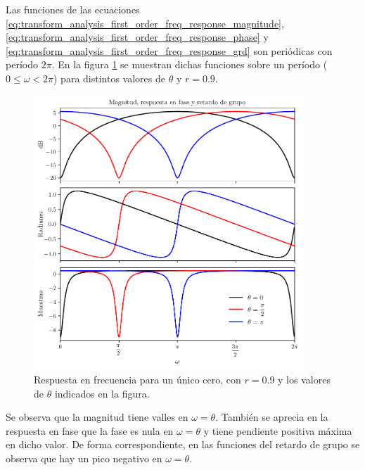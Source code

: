 \documentclass[a4paper]{report}
\begin{document}
Las funciones de las ecuaciones \ref{eq:transform_analysis_first_order_freq_response_magnitude}, \ref{eq:transform_analysis_first_order_freq_response_phase} y \ref{eq:transform_analysis_first_order_freq_response_grd} son periódicas con período \(2\pi\). En la figura \ref{fig:transform_analysis_first_order_freq_response_theta} se muestran dichas funciones sobre un período (\(0\leq\omega<2\pi\)) para distintos valores de \(\theta\) y \(r=0.9\).
\begin{figure}[!htb]
 \begin{center}
 \includegraphics[width=0.9\textwidth]{figuras/transform_analysis_first_order_freq_response_theta.pdf}
 \caption{\label{fig:transform_analysis_first_order_freq_response_theta} Respuesta en frecuencia para un único cero, con \(r=0.9\) y los valores de \(\theta\) indicados en la figura.}
 \end{center}
\end{figure}
Se observa que la magnitud tiene valles en \(\omega=\theta\). También se aprecia en la respuesta en fase que la fase es nula en \(\omega=\theta\) y tiene pendiente positiva máxima en dicho valor. De forma correspondiente, en las funciones del retardo de grupo se observa que hay un pico negativo en \(\omega=\theta\). 
\end{document}
